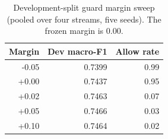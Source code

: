 \begin{table}[t]
\caption{Development-split guard margin sweep (pooled over four streams, five seeds). The frozen margin is $0.00$.}
\label{tab:guardmargin}
\centering
\footnotesize
\begin{tabular}{@{}rrr@{}}
\toprule
\textbf{Margin} & \textbf{Dev macro-F1} & \textbf{Allow rate}\\
\midrule
-0.05 & 0.7399 & 0.99 \\
+0.00 & 0.7437 & 0.95 \\
+0.02 & 0.7463 & 0.07 \\
+0.05 & 0.7466 & 0.03 \\
+0.10 & 0.7464 & 0.02 \\
\bottomrule
\end{tabular}
\end{table}
